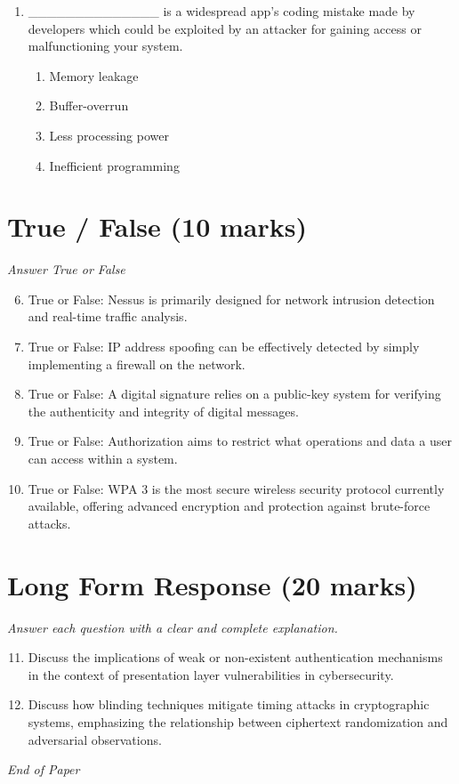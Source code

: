 \documentclass[12pt]{article}
\begin{document}
\begin{enumerate}[label=\arabic*.]
\begin{enumerate}[label=(\alph*)]
    \item Access Port
\end{enumerate}
\item \_\_\_\_\_\_\_\_\_\_\_\_\_\_ is a widespread app's coding mistake made by developers which could be exploited by an attacker for gaining access or malfunctioning your system.
\begin{enumerate}[label=(\alph*)]
    \item Memory leakage
    \item Buffer-overrun
    \item Less processing power
    \item Inefficient programming
\end{enumerate}
\end{enumerate}

\section*{True / False (10 marks)}
\textit{Answer True or False}
\begin{enumerate}[label=\arabic*.]
\setcounter{enumi}{5}
\item True or False: Nessus is primarily designed for network intrusion detection and real-time traffic analysis.
\item True or False: IP address spoofing can be effectively detected by simply implementing a firewall on the network.
\item True or False: A digital signature relies on a public-key system for verifying the authenticity and integrity of digital messages.
\item True or False: Authorization aims to restrict what operations and data a user can access within a system.
\item True or False: WPA 3 is the most secure wireless security protocol currently available, offering advanced encryption and protection against brute-force attacks.
\end{enumerate}

\section*{Long Form Response (20 marks)}
\textit{Answer each question with a clear and complete explanation.}
\begin{enumerate}[label=\arabic*.]
\setcounter{enumi}{10}
\item Discuss the implications of weak or non-existent authentication mechanisms in the context of presentation layer vulnerabilities in cybersecurity.
\item Discuss how blinding techniques mitigate timing attacks in cryptographic systems, emphasizing the relationship between ciphertext randomization and adversarial observations.
\end{enumerate}

\vfill
\noindent\textit{End of Paper}
\end{document}
